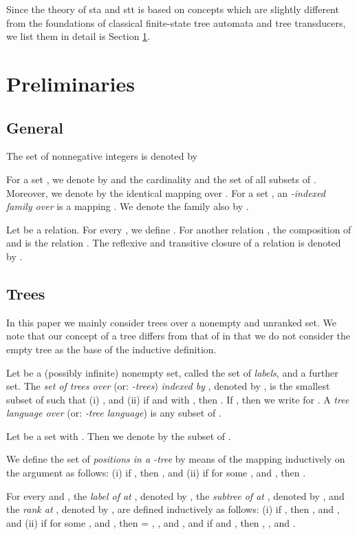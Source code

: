 \documentclass[10pt]{scrartcl}
\begin{document}
Since the theory of sta and stt is based on concepts which are slightly different from the foundations of classical finite-state tree automata and tree transducers, we list them in detail is Section  \ref{prel-section}.



\section{Preliminaries}\label{prel-section}


\subsection{General}

The set of nonnegative integers is denoted by  

For a set , we denote by  and  the cardinality and
the set of all subsets of . Moreover, we denote by  the identical mapping over . For a set , an \emph{-indexed family over } is a
mapping . We denote the family  also by . 

Let  be a relation. For every , we define .
For another relation , the composition of  and  is the relation
.
The reflexive and transitive closure of a relation  is denoted by .

\subsection{Trees}\label{sect:trees}

In this paper we mainly consider trees over a nonempty and unranked set. We note that our concept of a tree differs from that of \cite{veabjo11a,veabjo11b} in that we do not consider the empty tree as the base of the inductive definition. 

Let  be a (possibly infinite) nonempty set, called the set of {\em labels}, and  a further set. The {\em set of trees over } (or: {\em -trees}) {\em indexed by }, denoted by , is the smallest subset  of  such that  (i) , and (ii) if  and  with , then .  If , then we write  for . A {\em tree language over }  (or: {\em -tree language}) is any subset of .

Let  be a set with .  Then we denote by  the subset  of . 


We define the set of {\em positions in a  -tree} by means
of the mapping  inductively on the argument  as follows: (i) if  , then
, and (ii) if  for some , 
and , then . 

For every  and , the {\it
  label of  at   }, denoted by , the {\it
  subtree of  at   }, denoted by , 
and the {\it
  rank at }, denoted by , are defined inductively as follows: (i) if  , then
, and , and
(ii) if  for some ,
 and ,  then
 = , , and , and if   and , then , , and . 
\end{document}
